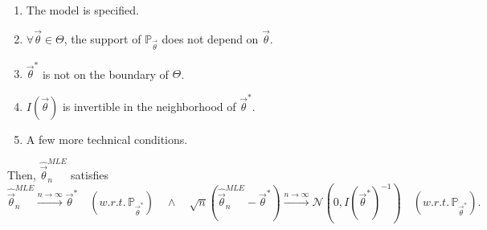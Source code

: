 \begin{enumerate}
	\item The model is specified.
	\item $\forall \vec{\theta}\in \Theta$, the support of $\mathbb{P}_{\vec{\theta}}$ does not depend on $\vec{\theta}$.
	\item $\vec{\theta}^*$ is not on the boundary of $\Theta$.
	\item $I(\vec{\theta})$ is invertible in the neighborhood of $\vec{\theta}^*$.
	\item A few more technical conditions.
\end{enumerate}
Then, $\hat{\vec{\theta}}^{MLE}_n$ satisfies
\begin{equation}
	\hat{\vec{\theta}}_n^{MLE}\xrightarrow[]{n\rightarrow\infty}\vec{\theta}^* \quad (w.r.t. \, \mathbb{P}_{\vec{\theta}^*})\quad \wedge \quad \sqrt{n}(\hat{\vec{\theta}}_n^{MLE}-\vec{\theta}^*)\xrightarrow[]{n\rightarrow\infty}\mathcal{N}(0,I(\vec{\theta}^*)^{-1})\quad (w.r.t. \, \mathbb{P}_{\vec{\theta}^*}).
\end{equation}

